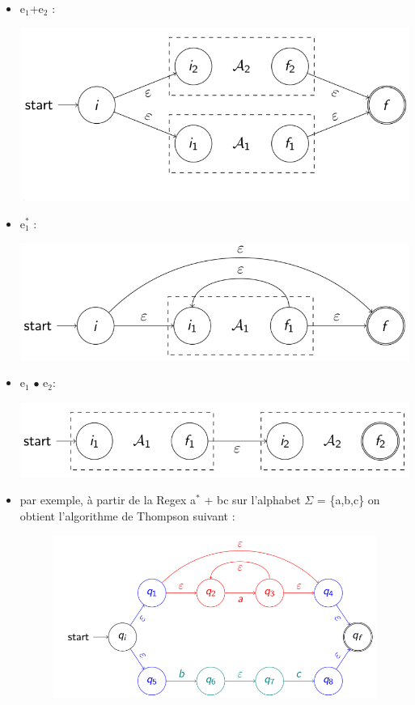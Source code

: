 \documentclass{article}
\begin{document}
\begin{itemize}
    \item e$_{1}$+e$_{2}$ :
    \begin{center}
        \includegraphics[scale=0.3]{Image5.png}
    \end{center}
    \item e$_{1}^{*}$ :
    \begin{center}
        \includegraphics[scale=0.3]{Image6.png}
    \end{center}
    \item e$_{1}$ $\bullet$ e$_{2}$:
    \begin{center}
	\includegraphics[scale=0.3]{Image7.png}
    \end{center}
    \newpage
    \item par exemple, à partir de la Regex a$^{*}$ + bc sur l'alphabet $\Sigma$ = \{a,b,c\} on obtient l'algorithme de Thompson suivant :
    \begin{figure}[h]
        \centering
        \includegraphics[scale=0.5]{Image8.png}
    \end{figure}


\end{itemize}
\end{document}
